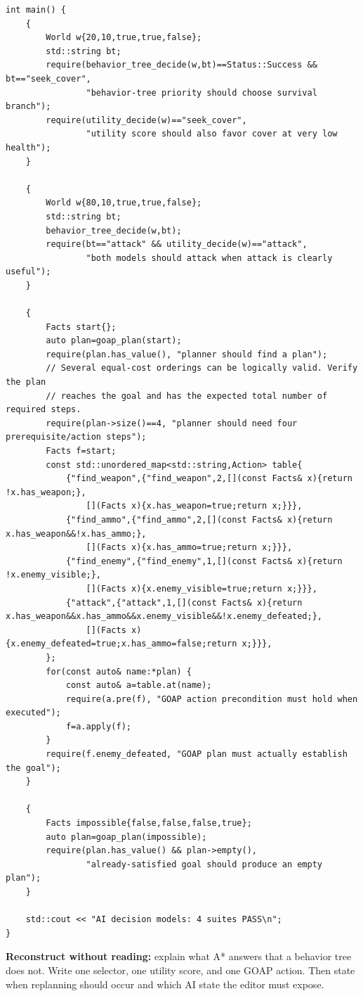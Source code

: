 \begin{verbatim}
int main() {
    {
        World w{20,10,true,true,false};
        std::string bt;
        require(behavior_tree_decide(w,bt)==Status::Success && bt=="seek_cover",
                "behavior-tree priority should choose survival branch");
        require(utility_decide(w)=="seek_cover",
                "utility score should also favor cover at very low health");
    }

    {
        World w{80,10,true,true,false};
        std::string bt;
        behavior_tree_decide(w,bt);
        require(bt=="attack" && utility_decide(w)=="attack",
                "both models should attack when attack is clearly useful");
    }

    {
        Facts start{};
        auto plan=goap_plan(start);
        require(plan.has_value(), "planner should find a plan");
        // Several equal-cost orderings can be logically valid. Verify the plan
        // reaches the goal and has the expected total number of required steps.
        require(plan->size()==4, "planner should need four prerequisite/action steps");
        Facts f=start;
        const std::unordered_map<std::string,Action> table{
            {"find_weapon",{"find_weapon",2,[](const Facts& x){return !x.has_weapon;},
                [](Facts x){x.has_weapon=true;return x;}}},
            {"find_ammo",{"find_ammo",2,[](const Facts& x){return x.has_weapon&&!x.has_ammo;},
                [](Facts x){x.has_ammo=true;return x;}}},
            {"find_enemy",{"find_enemy",1,[](const Facts& x){return !x.enemy_visible;},
                [](Facts x){x.enemy_visible=true;return x;}}},
            {"attack",{"attack",1,[](const Facts& x){return x.has_weapon&&x.has_ammo&&x.enemy_visible&&!x.enemy_defeated;},
                [](Facts x){x.enemy_defeated=true;x.has_ammo=false;return x;}}},
        };
        for(const auto& name:*plan) {
            const auto& a=table.at(name);
            require(a.pre(f), "GOAP action precondition must hold when executed");
            f=a.apply(f);
        }
        require(f.enemy_defeated, "GOAP plan must actually establish the goal");
    }

    {
        Facts impossible{false,false,false,true};
        auto plan=goap_plan(impossible);
        require(plan.has_value() && plan->empty(),
                "already-satisfied goal should produce an empty plan");
    }

    std::cout << "AI decision models: 4 suites PASS\n";
}
\end{verbatim}

\textbf{Reconstruct without reading:} explain what A* answers that a behavior tree does not. Write one selector, one utility score, and one GOAP action. Then state when replanning should occur and which AI state the editor must expose.

